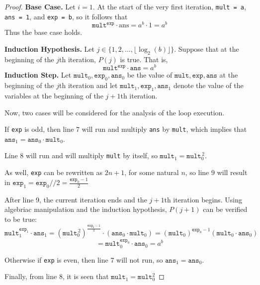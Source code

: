 \documentclass[11pt]{article}
\begin{document}
\begin{enumerate}[label=(\alph*)]
\begin{proof}
            \textbf{Base Case.} Let \(i=1\). At the start of the very first iteration, \verb|mult = a|, \verb|ans = 1|, and \verb|exp = b|, so it follows that
            \[
                \texttt{mult}^\texttt{exp} \cdot \text{ans} = a^b \cdot 1 = a^b
            \]
            Thus the base case holds.

            \textbf{Induction Hypothesis.} Let \(j \in \{1,2,..., \lfloor \log _2(b) \rfloor\}\). Suppose that at the beginning of the \(j\)th iteration, \(P(j)\) is true. That is,
            \[
                \texttt{mult}^\texttt{exp} \cdot \texttt{ans} = a^b
            \]
            \textbf{Induction Step.} Let \(\texttt{mult}_{0},\texttt{exp}_{0},\texttt{ans}_{0}\) be the value of  \(\texttt{mult},\texttt{exp},\texttt{ans}\) at the beginning of the \(j\)th iteration and let \(\texttt{mult}_{1},\texttt{exp}_{1},\texttt{ans}_{1}\) denote the value of the variables at the beginning of the \(j+1\)th iteration.

            Now, two cases will be considered for the analysis of the loop execution.

            If \verb|exp| is odd, then line 7 will run and multiply \verb|ans| by \verb|mult|, which implies that \(\texttt{ans}_1 = \texttt{ans}_0 \cdot \texttt{mult}_0\).

            Line 8 will run and will multiply \verb|mult| by itself, so \(\texttt{mult}_1 = \texttt{mult}_0^{\, 2}\).
            
            As well, \verb|exp| can be rewritten as \(2n+1\), for some natural \(n\), so line 9 will result in \(\texttt{exp}_1 = \texttt{exp}_0 // 2 = \frac{\texttt{exp}_0 - 1}{2}\)

            After line 9, the current iteration ends and the \(j+1\)th iteration begins. Using algebriac manipulation and the induction hypothesis, \(P(j+1)\) can be verified to be true:
            \[
                \texttt{mult}_1^{\texttt{exp}_1} \cdot \texttt{ans}_1 = (\texttt{mult}_0^{\, 2})^\frac{\texttt{exp}_0 - 1}{2} \cdot (\texttt{ans}_0 \cdot \texttt{mult}_0) = (\texttt{mult}_0)^{\texttt{exp}_0 - 1}(\texttt{mult}_0 \cdot \texttt{ans}_0)
            \]
            \[
                = \texttt{mult}_0 ^{\texttt{exp}_0} \cdot \texttt{ans}_0 = a^b
            \]

            Otherwise if \verb|exp| is even, then line 7 will not run, so \(\texttt{ans}_1 = \texttt{ans}_0\).

            Finally, from line 8, it is seen that \(\texttt{mult}_1 = \texttt{mult}_0^2\)


\end{proof}
\end{enumerate}
\end{document}
